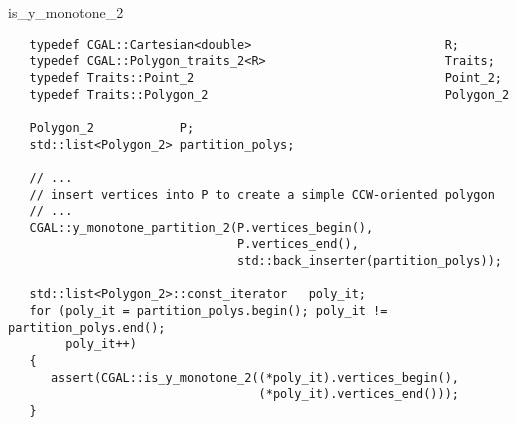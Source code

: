 \begin{ccRefFunction}{is_y_monotone_2}
\begin{verbatim}
   typedef CGAL::Cartesian<double>                           R;
   typedef CGAL::Polygon_traits_2<R>                         Traits;
   typedef Traits::Point_2                                   Point_2;
   typedef Traits::Polygon_2                                 Polygon_2

   Polygon_2            P;
   std::list<Polygon_2> partition_polys;

   // ...
   // insert vertices into P to create a simple CCW-oriented polygon
   // ...
   CGAL::y_monotone_partition_2(P.vertices_begin(),
                                P.vertices_end(),
                                std::back_inserter(partition_polys));

   std::list<Polygon_2>::const_iterator   poly_it;
   for (poly_it = partition_polys.begin(); poly_it != partition_polys.end();
        poly_it++)
   {
      assert(CGAL::is_y_monotone_2((*poly_it).vertices_begin(), 
                                   (*poly_it).vertices_end()));
   }
\end{verbatim}



\end{ccRefFunction}
